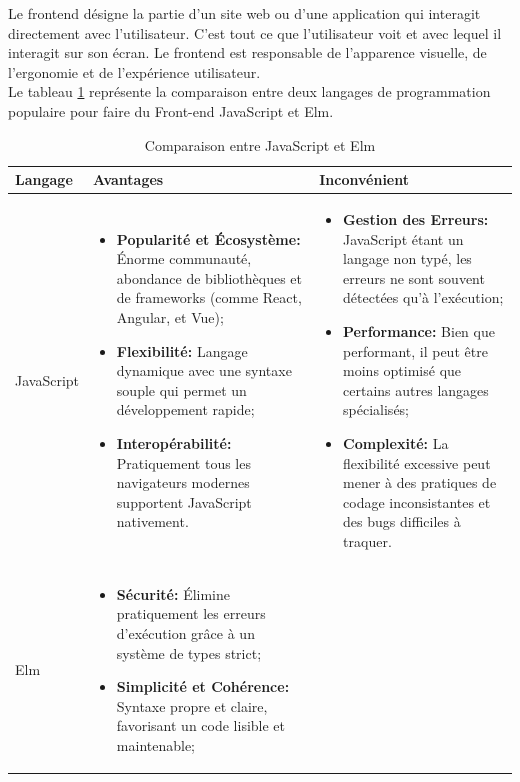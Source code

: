 \documentclass[12pt]{report}
\begin{document}
				Le frontend désigne la partie d'un site web ou d'une application qui interagit directement avec l'utilisateur. C'est tout ce que l'utilisateur voit et avec lequel il interagit sur son écran. Le frontend est responsable de l'apparence visuelle, de l'ergonomie et de l'expérience utilisateur.\\				

				Le tableau \ref{tab:front} représente la comparaison entre  deux langages de programmation populaire pour faire du Front-end JavaScript et Elm.


				\begin{longtable}{|p{3cm}|p{5.5cm}|p{5.5cm}|} 
						\caption{Comparaison entre JavaScript et Elm} 
						\label{tab:front}\\ 
						\hline 
						\textbf{Langage} & \textbf{Avantages} & \textbf{Inconvénient}\\ 
						\hline 
						\endfirsthead 	
						\endhead
						JavaScript&
						\begin{itemize}
							\item \textbf{Popularité et Écosystème:} Énorme communauté, abondance de bibliothèques et de frameworks (comme React, Angular, et Vue);
							\item \textbf{Flexibilité:} Langage dynamique avec une syntaxe souple qui permet un développement rapide;
							\item \textbf{Interopérabilité:} Pratiquement tous les navigateurs modernes supportent JavaScript nativement.
						\end{itemize}
						&
						\begin{itemize}
							\item \textbf{Gestion des Erreurs:} JavaScript étant un langage non typé, les erreurs ne sont souvent détectées qu'à l'exécution;
							\item \textbf{Performance:} Bien que performant, il peut être moins optimisé que certains autres langages spécialisés;
							\item \textbf{Complexité:} La flexibilité excessive peut mener à des pratiques de codage inconsistantes et des bugs difficiles à traquer.
						\end{itemize}\\						
						\hline
						Elm&
						\begin{itemize}
							\item \textbf{Sécurité:} Élimine pratiquement les erreurs d'exécution grâce à un système de types strict;
							\item \textbf{Simplicité et Cohérence:} Syntaxe propre et claire, favorisant un code lisible et maintenable;

\end{itemize}
\end{longtable}
\end{document}
